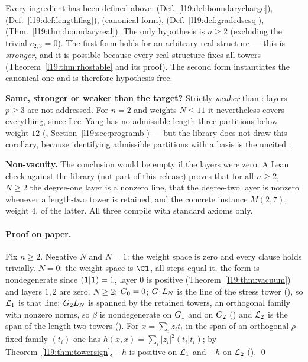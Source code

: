 \begin{dictionary}
Every ingredient has been defined above:  (Def.~\ref{l19:def:boundarycharge}),
 (Def.~\ref{l19:def:lengthflag}),  (canonical form),
 (Def.~\ref{l19:def:gradedsesq}), 
(Thm.~\ref{l19:thm:boundaryreal}). The only hypothesis is $n\ge2$ (excluding the trivial $c_{2,3} = 0$).
The first form holds for an arbitrary real structure  --- this is \emph{stronger}, and it is
possible because every real structure fixes all towers (Theorem~\ref{l19:thm:rhostable} and its proof).
The second form instantiates the canonical one and is therefore hypothesis-free.

\textbf{Same, stronger or weaker than the target?} Strictly \emph{weaker} than
: layers $p\ge3$ are not addressed. For $n=2$ and weights
$N\le 11$ it nevertheless covers everything, since Lee--Yang has no admissible length-three partitions
below weight $12$ (\allowbreak{}\allowbreak{}\allowbreak{}, Section~\ref{l19:sec:programb}) --- but the library
does not draw this corollary, because identifying admissible partitions with a basis is the uncited
.

\textbf{Non-vacuity.} The conclusion would be empty if the layers were zero. A Lean check against the
library (not part of this release) proves that for all $n\ge2$, $N\ge2$ the degree-one layer is a nonzero line,
that the degree-two layer is nonzero whenever a length-two tower is retained,
and the concrete instance $M(2,7)$, weight $4$, of the latter. All three
compile with standard axioms only.
\end{dictionary}

\paragraph{Proof on paper.} Fix $n\ge2$. Negative $N$ and $N=1$: the weight space is zero and every clause
holds trivially. $N=0$: the weight space is $\C\lnineteenvac$, all steps equal it, the form is nondegenerate
since $(\mathbf{1}|\mathbf{1}) = 1$, layer $0$ is positive (Theorem~\ref{l19:thm:vacuum}) and layers $1,2$ are
zero. $N\ge2$: $G_0 = 0$; $G_1L_N$ is the line of the stress tower
(), so $\mathcal{L}_1$ is that line; $G_2L_N$ is spanned by the
retained towers, an orthogonal family with nonzero norms, so $\beta$ is nondegenerate on $G_1$ and on
$G_2$ (\allowbreak{}\allowbreak{}\allowbreak{}\allowbreak{}\allowbreak{}) and $\mathcal{L}_2$ is the span of the
length-two towers (). For $x = \sum_iz_it_i$ in the span of an orthogonal
$\rho$-fixed family $(t_i)$ one has $h(x,x) = \sum_i|z_i|^2(t_i|t_i)$; by Theorem~\ref{l19:thm:towersign},
$-h$ is positive on $\mathcal{L}_1$ and $+h$ on $\mathcal{L}_2$ (\allowbreak{}\allowbreak{}\allowbreak{}\allowbreak{}). \qed

